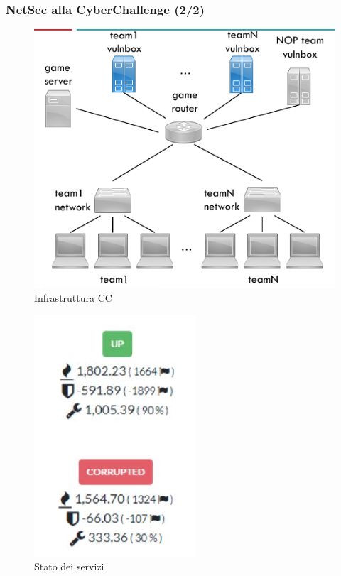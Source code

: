 \documentclass[aspectratio=169]{beamer}
\begin{document}
    \begin{frame}
        \frametitle{NetSec alla CyberChallenge (2/2)}
        \begin{minipage}{\linewidth}
            \centering
            \begin{minipage}{0.45\linewidth}
                \begin{figure}[H]
                  \includegraphics[width=0.88\linewidth]{img/infra-CC.png}
                  \caption{Infrastruttura CC}
                \end{figure}
            \end{minipage}
            \hspace{0.05\linewidth}
            \begin{minipage}{0.45\linewidth}
                \begin{figure}[H]
                  \includegraphics[width=0.5\linewidth]{img/servizi-CC.png}
                  \caption{Stato dei servizi}
                \end{figure}
            \end{minipage}
        \end{minipage}
    \end{frame}
    
\end{document}
